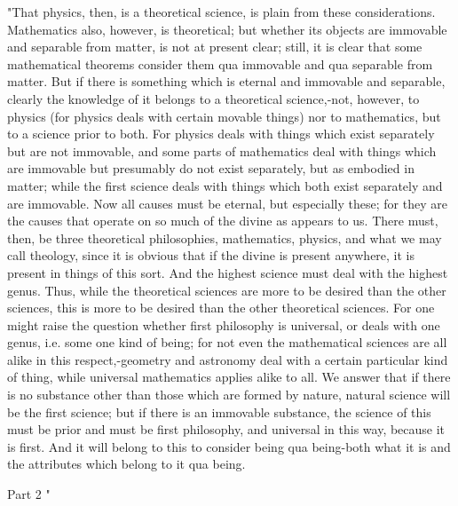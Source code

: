 "That physics, then, is a theoretical science, is plain from these
considerations. Mathematics also, however, is theoretical; but whether
its objects are immovable and separable from matter, is not at present
clear; still, it is clear that some mathematical theorems consider
them qua immovable and qua separable from matter. But if there is
something which is eternal and immovable and separable, clearly the
knowledge of it belongs to a theoretical science,-not, however, to
physics (for physics deals with certain movable things) nor to mathematics,
but to a science prior to both. For physics deals with things which
exist separately but are not immovable, and some parts of mathematics
deal with things which are immovable but presumably do not exist separately,
but as embodied in matter; while the first science deals with things
which both exist separately and are immovable. Now all causes must
be eternal, but especially these; for they are the causes that operate
on so much of the divine as appears to us. There must, then, be three
theoretical philosophies, mathematics, physics, and what we may call
theology, since it is obvious that if the divine is present anywhere,
it is present in things of this sort. And the highest science must
deal with the highest genus. Thus, while the theoretical sciences
are more to be desired than the other sciences, this is more to be
desired than the other theoretical sciences. For one might raise the
question whether first philosophy is universal, or deals with one
genus, i.e. some one kind of being; for not even the mathematical
sciences are all alike in this respect,-geometry and astronomy deal
with a certain particular kind of thing, while universal mathematics
applies alike to all. We answer that if there is no substance other
than those which are formed by nature, natural science will be the
first science; but if there is an immovable substance, the science
of this must be prior and must be first philosophy, and universal
in this way, because it is first. And it will belong to this to consider
being qua being-both what it is and the attributes which belong to
it qua being. 

Part 2 "

